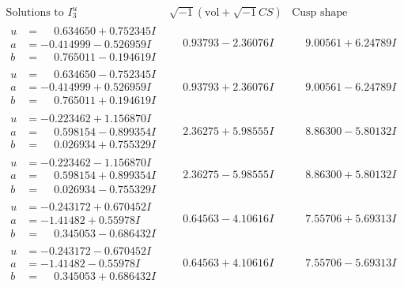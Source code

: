 \documentclass[1p]{elsarticle_modified}
\theoremstyle{definition}
\newcommand{\I}{\sqrt{-1}}
\begin{document}
$$\begin{array}{c|c|c}  
\text{Solutions to }I^u_{3}& \I (\text{vol} + \sqrt{-1}CS) & \text{Cusp shape}\\
 \hline 
\begin{aligned}
u &= \phantom{-}0.634650 + 0.752345 I \\
a &= -0.414999 - 0.526959 I \\
b &= \phantom{-}0.765011 - 0.194619 I\end{aligned}
 & \phantom{-}0.93793 - 2.36076 I & \phantom{-}9.00561 + 6.24789 I \\ \hline\begin{aligned}
u &= \phantom{-}0.634650 - 0.752345 I \\
a &= -0.414999 + 0.526959 I \\
b &= \phantom{-}0.765011 + 0.194619 I\end{aligned}
 & \phantom{-}0.93793 + 2.36076 I & \phantom{-}9.00561 - 6.24789 I \\ \hline\begin{aligned}
u &= -0.223462 + 1.156870 I \\
a &= \phantom{-}0.598154 - 0.899354 I \\
b &= \phantom{-}0.026934 + 0.755329 I\end{aligned}
 & \phantom{-}2.36275 + 5.98555 I & \phantom{-}8.86300 - 5.80132 I \\ \hline\begin{aligned}
u &= -0.223462 - 1.156870 I \\
a &= \phantom{-}0.598154 + 0.899354 I \\
b &= \phantom{-}0.026934 - 0.755329 I\end{aligned}
 & \phantom{-}2.36275 - 5.98555 I & \phantom{-}8.86300 + 5.80132 I \\ \hline\begin{aligned}
u &= -0.243172 + 0.670452 I \\
a &= -1.41482 + 0.55978 I \\
b &= \phantom{-}0.345053 - 0.686432 I\end{aligned}
 & \phantom{-}0.64563 - 4.10616 I & \phantom{-}7.55706 + 5.69313 I \\ \hline\begin{aligned}
u &= -0.243172 - 0.670452 I \\
a &= -1.41482 - 0.55978 I \\
b &= \phantom{-}0.345053 + 0.686432 I\end{aligned}
 & \phantom{-}0.64563 + 4.10616 I & \phantom{-}7.55706 - 5.69313 I \\ \hline\begin{aligned}

\end{aligned}
\end{array}$$
\end{document}
